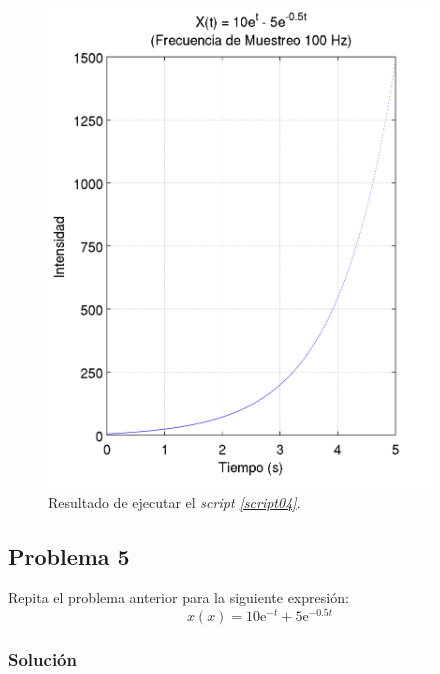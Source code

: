 \documentclass[a4paper,12pt,final]{article}
\begin{document}
      \begin{figure}[H]
        \caption{Resultado de ejecutar el \emph{script \ref{script04}}.}
        \label{script04figure}
        \includegraphics[height=5in]{./laboratorio_2/problema04.png}
      \end{figure}
      \vspace{\fill}

  \newpage
  \subsection*{Problema 5}
    \noindent Repita el problema anterior para la siguiente expresión:
    $$x\left(x\right) = 10\mathrm{e}^{-t} + 5\mathrm{e}^{-0.5t}$$

    \subsubsection*{Solución}
      \begin{listing}[H]
        \caption{}
        \label{script05}
        \inputminted{matlab}{./laboratorio_2/problema05.m}
      \end{listing}
\end{document}
